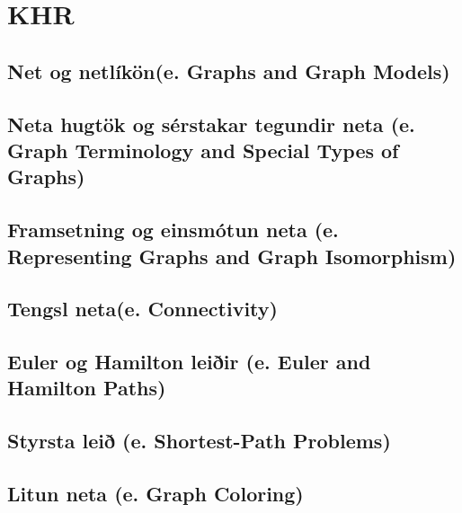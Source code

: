 \section{KHR}

\subsection{Net og netlíkön(e. Graphs and Graph Models)}
\subsection{Neta hugtök og sérstakar tegundir neta (e. Graph Terminology and Special Types of Graphs)}
\subsection{Framsetning og einsmótun neta (e. Representing Graphs and Graph Isomorphism)}
\subsection{Tengsl neta(e. Connectivity)}
\subsection{Euler og Hamilton leiðir (e. Euler and Hamilton Paths)}
\subsection{Styrsta leið (e. Shortest-Path Problems)}

\setcounter{subsection}{7}
\subsection{Litun neta (e. Graph Coloring)}

\newpage
